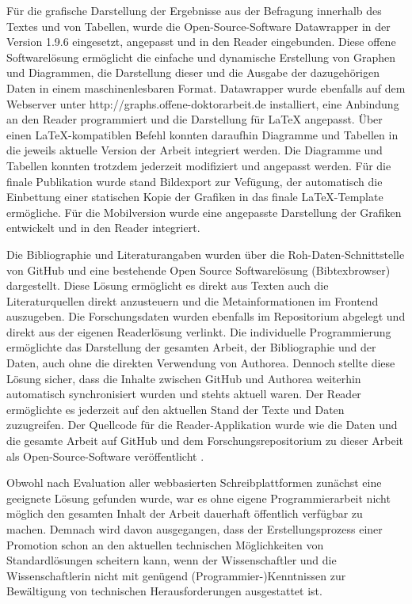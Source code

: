 Für die grafische Darstellung der Ergebnisse aus der Befragung innerhalb des Textes und von Tabellen, wurde die Open-Source-Software Datawrapper \cite{datawrapper_2015} in der Version 1.9.6 eingesetzt, angepasst und in den Reader eingebunden. Diese offene Softwarelösung ermöglicht die einfache und dynamische Erstellung von Graphen und Diagrammen, die Darstellung dieser und die Ausgabe der dazugehörigen Daten in einem maschinenlesbaren Format. Datawrapper wurde ebenfalls auf dem Webserver unter http://graphs.offene-doktorarbeit.de installiert, eine Anbindung an den Reader programmiert und die Darstellung für LaTeX angepasst. Über einen LaTeX-kompatiblen Befehl konnten daraufhin Diagramme und Tabellen in die jeweils aktuelle Version der Arbeit integriert werden. Die Diagramme und Tabellen konnten trotzdem jederzeit modifiziert und angepasst werden. Für die finale Publikation wurde stand Bildexport zur Vefügung, der automatisch die Einbettung einer statischen Kopie der Grafiken in das finale LaTeX-Template ermögliche. Für die Mobilversion wurde eine angepasste Darstellung der Grafiken entwickelt und in den Reader integriert.

Die Bibliographie und Literaturangaben wurden über die Roh-Daten-Schnittstelle von GitHub und eine bestehende Open Source Softwarelösung (Bibtexbrowser) dargestellt. Diese Lösung ermöglicht es direkt aus Texten auch die Literaturquellen direkt anzusteuern und die Metainformationen im Frontend auszugeben. Die Forschungsdaten wurden ebenfalls im Repositorium abgelegt und direkt aus der eigenen Readerlösung verlinkt. Die individuelle Programmierung ermöglichte das Darstellung der gesamten Arbeit, der Bibliographie und der Daten, auch ohne die direkten Verwendung von Authorea. Dennoch stellte diese Lösung sicher, dass die Inhalte zwischen GitHub und Authorea weiterhin automatisch synchronisiert wurden und stehts aktuell waren. Der Reader ermöglichte es jederzeit auf den aktuellen Stand der Texte und Daten zuzugreifen. Der Quellcode für die Reader-Applikation wurde wie die Daten und die gesamte Arbeit auf GitHub und dem Forschungsrepositorium zu dieser Arbeit als Open-Source-Software veröffentlicht \cite{heise_2015_reader}.

Obwohl nach Evaluation aller webbasierten Schreibplattformen zunächst eine geeignete Lösung gefunden wurde, war es ohne eigene Programmierarbeit nicht möglich den gesamten Inhalt der Arbeit dauerhaft öffentlich verfügbar zu machen. Demnach wird davon ausgegangen, dass der Erstellungsprozess einer Promotion schon an den aktuellen technischen Möglichkeiten von Standardlösungen scheitern kann, wenn der Wissenschaftler und die Wissenschaftlerin nicht mit genügend (Programmier-)Kenntnissen zur Bewältigung von technischen Herausforderungen ausgestattet ist.


